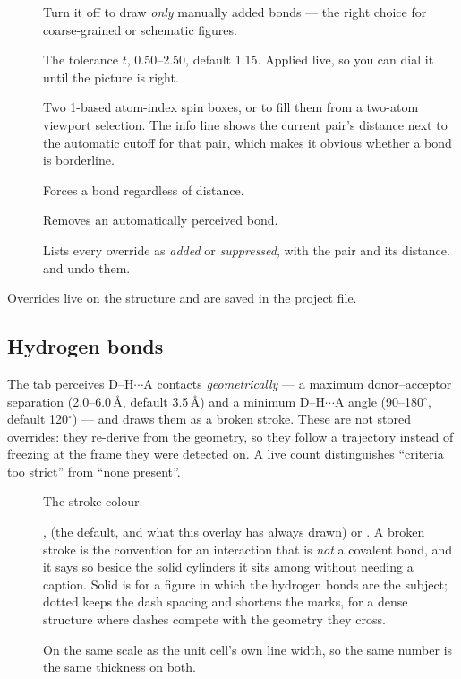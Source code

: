 \begin{description}
  \item[] Turn it off to draw \emph{only}
    manually added bonds --- the right choice for coarse-grained or
    schematic figures.
  \item[] The tolerance $t$, 0.50--2.50,
    default 1.15. Applied live, so you can dial it until the picture is
    right.
  \item[] Two 1-based atom-index spin boxes, or
     to fill them from a two-atom viewport selection.
    The info line shows the current pair's distance next to the automatic
    cutoff for that pair, which makes it obvious whether a bond is
    borderline.
  \item[] Forces a bond regardless of distance.
  \item[] Removes an automatically perceived bond.
  \item[] Lists every override as \emph{added} or
    \emph{suppressed}, with the pair and its distance.
     and  undo them.
\end{description}

Overrides live on the structure and are saved in the project file.

\subsection{Hydrogen bonds}
\label{sec:hydrogen-bonds}

The  tab perceives D--H$\cdots$A contacts
\emph{geometrically} --- a maximum donor--acceptor separation
(2.0--6.0\,\AA, default 3.5\,\AA) and a minimum D--H$\cdots$A angle
(90--180$^\circ$, default 120$^\circ$) --- and draws them as a broken
stroke. These are not stored overrides: they re-derive from the geometry, so
they follow a trajectory instead of freezing at the frame they were detected
on. A live count distinguishes ``criteria too strict'' from ``none
present''.

\begin{description}
  \item[] The stroke colour.
  \item[] ,  (the default, and what
    this overlay has always drawn) or . A broken stroke is the
    convention for an interaction that is \emph{not} a covalent bond, and
    it says so beside the solid cylinders it sits among without needing a
    caption. Solid is for a figure in which the hydrogen bonds are the
    subject; dotted keeps the dash spacing and shortens the marks, for a
    dense structure where dashes compete with the geometry they cross.
  \item[] On the same scale as the unit cell's own line
    width, so the same number is the same thickness on both.
\end{description}

